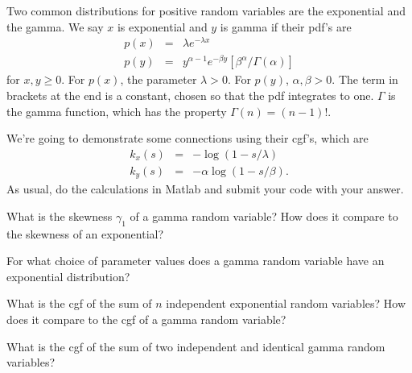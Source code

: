 \documentclass[11pt]{exam}
\begin{document}
\begin{questions}
\begin{solution}
\end{solution}

Two common distributions for positive random variables are the
exponential and the gamma.
We say $x$ is exponential and $y$ is gamma if their pdf's are
\begin{eqnarray*}
    p(x) &=& \lambda e^{-\lambda x} \\
    p(y) &=& y^{\alpha-1} e^{-\beta y} [\beta^\alpha / \Gamma(\alpha)]
\end{eqnarray*}
for $x,y \geq 0$.
For $p(x)$, the parameter $\lambda > 0$.
For $p(y)$, $\alpha,\beta > 0$.
The term in brackets at the end is a constant, chosen so that the pdf integrates to one.
$\Gamma$ is the gamma function, which has the property $\Gamma(n) = (n-1)!$.

We're going to demonstrate some connections using their cgf's, which are
\begin{eqnarray*}
    k_x(s)  &=& - \log \left( 1 - s/\lambda \right) \\
    k_y(s)  &=& - \alpha \log \left( 1 - s/\beta \right) .
\end{eqnarray*}
As usual, do the calculations in Matlab and submit your code with your answer.
%
\begin{parts}
\item What is the skewness $\gamma_1$ of a gamma random variable?
How does it compare to the skewness of an exponential?
\item For what choice of parameter values does a gamma random variable have an exponential distribution?
\item What is the cgf of the sum of $n$ independent exponential random variables?
How does it compare to the cgf of a gamma random variable?
\item What is the cgf of the sum of two independent and identical gamma random variables?
\end{parts}


\end{questions}
\end{document}
